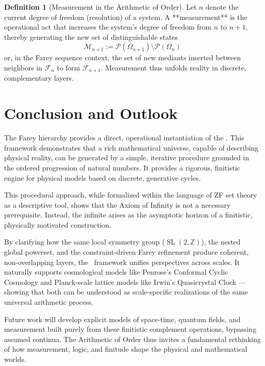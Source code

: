 \documentclass[12pt,a4paper]{article}
\theoremstyle{plain}
\theoremstyle{definition}
\newtheorem{definition}[theorem]{Definition}
\theoremstyle{remark}
\newcommand{\AoO}{\text{Arithmetic of Order}}
\newcommand{\integers}{\mathbb{Z}}
\DeclareMathOperator{\SL}{SL}
\newcommand{\powerset}{\mathcal{P}}
\newcommand{\Fseq}[1]{\mathcal{F}_{#1}}      %
\begin{document}
\begin{definition}[Measurement in the Arithmetic of Order]
Let $n$ denote the current degree of freedom (resolution) of a system. A **measurement** is the operational act that increases the system’s degree of freedom from $n$ to $n+1$, thereby generating the new set of distinguishable states
\[\mathcal{M}_{n+1} := \powerset(\Omega_{n+1}) \setminus \powerset(\Omega_n)\]
or, in the Farey sequence context, the set of new mediants inserted between neighbors in $\Fseq{n}$ to form $\Fseq{n+1}$. Measurement thus unfolds reality in discrete, complementary layers.
\end{definition}

\section{Conclusion and Outlook}

The Farey hierarchy provides a direct, operational instantiation of the \AoO. This framework demonstrates that a rich mathematical universe, capable of describing physical reality, can be generated by a simple, iterative procedure grounded in the ordered progression of natural numbers. It provides a rigorous, finitistic engine for physical models based on discrete, generative cycles.

This procedural approach, while formalized within the language of ZF set theory as a descriptive tool, shows that the Axiom of Infinity is not a necessary prerequisite. Instead, the infinite arises as the asymptotic horizon of a finitistic, physically motivated construction.

By clarifying how the same local symmetry group ($\SL(2,\integers)$), the nested global powerset, and the constraint-driven Farey refinement produce coherent, non-overlapping layers, the \AoO\ framework unifies perspectives across scales. It naturally supports cosmological models like Penrose's Conformal Cyclic Cosmology and Planck-scale lattice models like Irwin's Quasicrystal Clock — showing that both can be understood as scale-specific realizations of the same universal arithmetic process.

Future work will develop explicit models of space-time, quantum fields, and measurement built purely from these finitistic complement operations, bypassing assumed continua. The Arithmetic of Order thus invites a fundamental rethinking of how measurement, logic, and finitude shape the physical and mathematical worlds.
\end{document}
